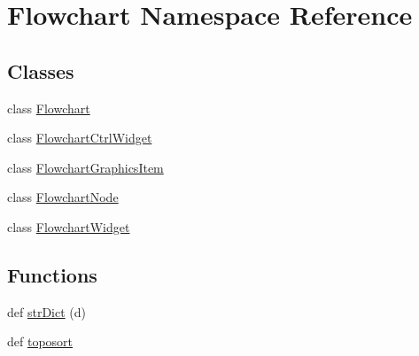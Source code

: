 \hypertarget{namespaceFlowchart}{}\section{Flowchart Namespace Reference}
\label{namespaceFlowchart}
\subsection*{Classes}
\begin{DoxyCompactItemize}
\item 
class \hyperlink{classFlowchart_1_1Flowchart}{Flowchart}
\item 
class \hyperlink{classFlowchart_1_1FlowchartCtrlWidget}{Flowchart\+Ctrl\+Widget}
\item 
class \hyperlink{classFlowchart_1_1FlowchartGraphicsItem}{Flowchart\+Graphics\+Item}
\item 
class \hyperlink{classFlowchart_1_1FlowchartNode}{Flowchart\+Node}
\item 
class \hyperlink{classFlowchart_1_1FlowchartWidget}{Flowchart\+Widget}
\end{DoxyCompactItemize}
\subsection*{Functions}
\begin{DoxyCompactItemize}
\item 
def \hyperlink{namespaceFlowchart_a4df8d2b9c9d35144082607ac873bbb0e}{str\+Dict} (d)
\item 
def \hyperlink{namespaceFlowchart_a3a8dec1a56afa0fb5e704625606501b6}{toposort}
\end{DoxyCompactItemize}
